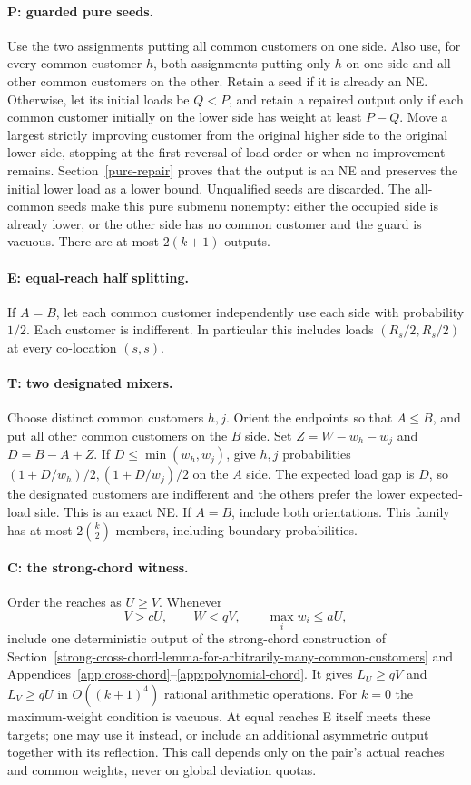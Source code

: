 \documentclass[11pt,a4paper]{article}
\begin{document}
\paragraph{P: guarded pure seeds.}
Use the two assignments putting all common customers on one side. Also use,
for every common customer $h$, both assignments putting only $h$ on one side
and all other common customers on the other. Retain a seed if it is already
an NE. Otherwise, let its initial loads be $Q<P$, and retain a repaired
output only if each common customer initially on the lower side has weight
at least $P-Q$. Move a largest strictly improving customer from the original
higher side to the original lower side, stopping at the first reversal of
load order or when no improvement remains. Section~\ref{pure-repair} proves
that the output is an NE and preserves the initial lower load as a lower
bound. Unqualified seeds are discarded. The all-common seeds make this
pure submenu nonempty: either the occupied side is already lower, or the
other side has no common customer and the guard is vacuous.
There are at most $2(k+1)$ outputs.

\paragraph{E: equal-reach half splitting.}
If $A=B$, let each common customer independently use each side with
probability $1/2$. Each customer is indifferent. In particular this includes
loads $(R_s/2,R_s/2)$ at every co-location $(s,s)$.

\paragraph{T: two designated mixers.}
Choose distinct common customers $h,j$. Orient the endpoints so that
$A\le B$, and put all other common customers on the $B$ side. Set
$Z=W-w_h-w_j$ and $D=B-A+Z$. If $D\le\min(w_h,w_j)$, give $h,j$
probabilities $(1+D/w_h)/2,(1+D/w_j)/2$ on the $A$ side.
The expected load gap is $D$, so the designated customers are indifferent
and the others prefer the lower expected-load side. This is an exact NE.
If $A=B$, include both orientations. This family has at most
$2\binom{k}{2}$ members, including boundary probabilities.

\paragraph{C: the strong-chord witness.}
Order the reaches as $U\ge V$. Whenever
\[
 V>cU,\qquad W<qV,\qquad \max_iw_i\le aU,
\]
include one deterministic output of the strong-chord construction of
Section~\ref{strong-cross-chord-lemma-for-arbitrarily-many-common-customers}
and Appendices~\ref{app:cross-chord}--\ref{app:polynomial-chord}.
It gives $L_U\ge qV$ and $L_V\ge qU$ in
$O((k+1)^4)$ rational arithmetic operations. For $k=0$ the maximum-weight
condition is vacuous. At equal reaches E itself meets these targets; one
may use it instead, or include an additional asymmetric output together
with its reflection. This call depends only on the pair's actual reaches
and common weights, never on global deviation quotas.
\end{document}
